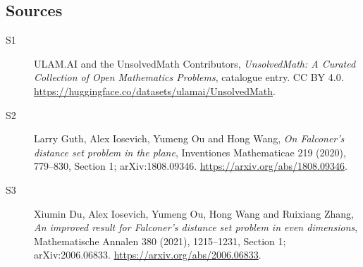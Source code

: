 \documentclass[11pt]{article}
\begin{document}
\subsection{Sources}
\begin{description}
\item[\hypertarget{source:statement:1}{S1}] ULAM.AI and the UnsolvedMath Contributors, \emph{UnsolvedMath: A Curated Collection of Open Mathematics Problems}, catalogue entry. CC BY 4.0. \url{https://huggingface.co/datasets/ulamai/UnsolvedMath}.
\item[\hypertarget{source:statement:2}{S2}] Larry Guth, Alex Iosevich, Yumeng Ou and Hong Wang, \emph{On Falconer's distance set problem in the plane}, Inventiones Mathematicae 219 (2020), 779--830, Section 1; arXiv:1808.09346. \url{https://arxiv.org/abs/1808.09346}.
\item[\hypertarget{source:statement:3}{S3}] Xiumin Du, Alex Iosevich, Yumeng Ou, Hong Wang and Ruixiang Zhang, \emph{An improved result for Falconer's distance set problem in even dimensions}, Mathematische Annalen 380 (2021), 1215--1231, Section 1; arXiv:2006.06833. \url{https://arxiv.org/abs/2006.06833}.
\end{description}
\label{end:statement}
\end{document}
